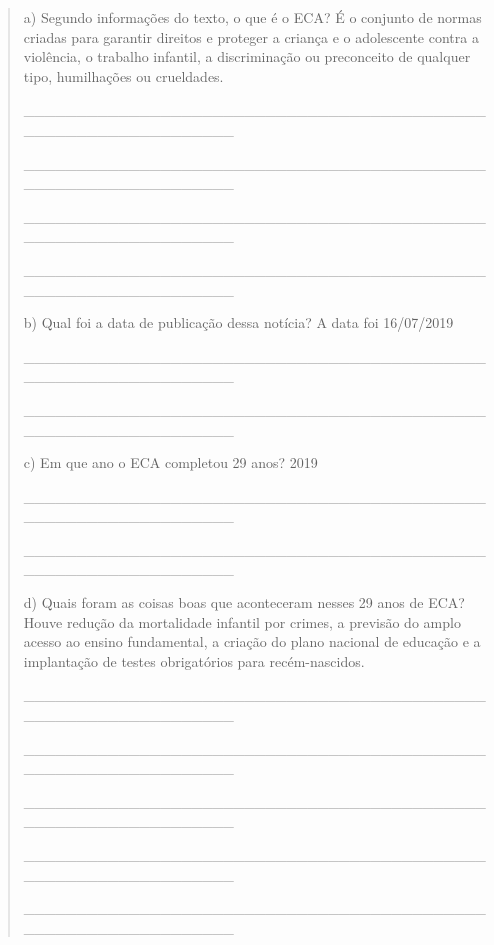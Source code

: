 \begin{quote}
a) Segundo informações do texto, o que é o ECA? É o conjunto de normas
criadas para garantir direitos e proteger a criança e o adolescente
contra a violência, o trabalho infantil, a discriminação ou preconceito
de qualquer tipo, humilhações ou crueldades.

\_\_\_\_\_\_\_\_\_\_\_\_\_\_\_\_\_\_\_\_\_\_\_\_\_\_\_\_\_\_\_\_\_\_\_\_\_\_\_\_\_\_\_\_\_\_\_\_\_\_\_\_\_\_\_\_\_\_\_\_\_\_\_\_

\_\_\_\_\_\_\_\_\_\_\_\_\_\_\_\_\_\_\_\_\_\_\_\_\_\_\_\_\_\_\_\_\_\_\_\_\_\_\_\_\_\_\_\_\_\_\_\_\_\_\_\_\_\_\_\_\_\_\_\_\_\_\_\_

\_\_\_\_\_\_\_\_\_\_\_\_\_\_\_\_\_\_\_\_\_\_\_\_\_\_\_\_\_\_\_\_\_\_\_\_\_\_\_\_\_\_\_\_\_\_\_\_\_\_\_\_\_\_\_\_\_\_\_\_\_\_\_\_

\_\_\_\_\_\_\_\_\_\_\_\_\_\_\_\_\_\_\_\_\_\_\_\_\_\_\_\_\_\_\_\_\_\_\_\_\_\_\_\_\_\_\_\_\_\_\_\_\_\_\_\_\_\_\_\_\_\_\_\_\_\_\_\_

b) Qual foi a data de publicação dessa notícia? A data foi 16/07/2019~

\_\_\_\_\_\_\_\_\_\_\_\_\_\_\_\_\_\_\_\_\_\_\_\_\_\_\_\_\_\_\_\_\_\_\_\_\_\_\_\_\_\_\_\_\_\_\_\_\_\_\_\_\_\_\_\_\_\_\_\_\_\_\_\_

\_\_\_\_\_\_\_\_\_\_\_\_\_\_\_\_\_\_\_\_\_\_\_\_\_\_\_\_\_\_\_\_\_\_\_\_\_\_\_\_\_\_\_\_\_\_\_\_\_\_\_\_\_\_\_\_\_\_\_\_\_\_\_\_

c) Em que ano o ECA completou 29 anos? 2019

\_\_\_\_\_\_\_\_\_\_\_\_\_\_\_\_\_\_\_\_\_\_\_\_\_\_\_\_\_\_\_\_\_\_\_\_\_\_\_\_\_\_\_\_\_\_\_\_\_\_\_\_\_\_\_\_\_\_\_\_\_\_\_\_

\_\_\_\_\_\_\_\_\_\_\_\_\_\_\_\_\_\_\_\_\_\_\_\_\_\_\_\_\_\_\_\_\_\_\_\_\_\_\_\_\_\_\_\_\_\_\_\_\_\_\_\_\_\_\_\_\_\_\_\_\_\_\_\_

d) Quais foram as coisas boas que aconteceram nesses 29 anos de ECA?
Houve redução da mortalidade infantil por crimes, a previsão do amplo
acesso ao ensino fundamental, a criação do plano nacional de educação e
a implantação de testes obrigatórios para recém-nascidos.

\_\_\_\_\_\_\_\_\_\_\_\_\_\_\_\_\_\_\_\_\_\_\_\_\_\_\_\_\_\_\_\_\_\_\_\_\_\_\_\_\_\_\_\_\_\_\_\_\_\_\_\_\_\_\_\_\_\_\_\_\_\_\_\_

\_\_\_\_\_\_\_\_\_\_\_\_\_\_\_\_\_\_\_\_\_\_\_\_\_\_\_\_\_\_\_\_\_\_\_\_\_\_\_\_\_\_\_\_\_\_\_\_\_\_\_\_\_\_\_\_\_\_\_\_\_\_\_\_

\protect\hypertarget{_Hlk128040463}{}{}\_\_\_\_\_\_\_\_\_\_\_\_\_\_\_\_\_\_\_\_\_\_\_\_\_\_\_\_\_\_\_\_\_\_\_\_\_\_\_\_\_\_\_\_\_\_\_\_\_\_\_\_\_\_\_\_\_\_\_\_\_\_\_\_

\_\_\_\_\_\_\_\_\_\_\_\_\_\_\_\_\_\_\_\_\_\_\_\_\_\_\_\_\_\_\_\_\_\_\_\_\_\_\_\_\_\_\_\_\_\_\_\_\_\_\_\_\_\_\_\_\_\_\_\_\_\_\_\_

\_\_\_\_\_\_\_\_\_\_\_\_\_\_\_\_\_\_\_\_\_\_\_\_\_\_\_\_\_\_\_\_\_\_\_\_\_\_\_\_\_\_\_\_\_\_\_\_\_\_\_\_\_\_\_\_\_\_\_\_\_\_\_\_
\end{quote}

